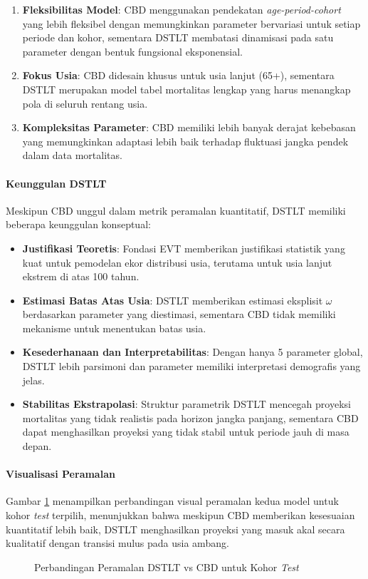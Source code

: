 \begin{enumerate}
    \item \textbf{Fleksibilitas Model}: CBD menggunakan pendekatan \textit{age-period-cohort} yang lebih fleksibel dengan memungkinkan parameter bervariasi untuk setiap periode dan kohor, sementara DSTLT membatasi dinamisasi pada satu parameter dengan bentuk fungsional eksponensial.
    
    \item \textbf{Fokus Usia}: CBD didesain khusus untuk usia lanjut (65+), sementara DSTLT merupakan model tabel mortalitas lengkap yang harus menangkap pola di seluruh rentang usia.
    
    \item \textbf{Kompleksitas Parameter}: CBD memiliki lebih banyak derajat kebebasan yang memungkinkan adaptasi lebih baik terhadap fluktuasi jangka pendek dalam data mortalitas.
\end{enumerate}

\paragraph{Keunggulan DSTLT}
Meskipun CBD unggul dalam metrik peramalan kuantitatif, DSTLT memiliki beberapa keunggulan konseptual:

\begin{itemize}
    \item \textbf{Justifikasi Teoretis}: Fondasi EVT memberikan justifikasi statistik yang kuat untuk pemodelan ekor distribusi usia, terutama untuk usia lanjut ekstrem di atas 100 tahun.
    
    \item \textbf{Estimasi Batas Atas Usia}: DSTLT memberikan estimasi eksplisit $\omega$ berdasarkan parameter yang diestimasi, sementara CBD tidak memiliki mekanisme untuk menentukan batas usia.
    
    \item \textbf{Kesederhanaan dan Interpretabilitas}: Dengan hanya 5 parameter global, DSTLT lebih parsimoni dan parameter memiliki interpretasi demografis yang jelas.
    
    \item \textbf{Stabilitas Ekstrapolasi}: Struktur parametrik DSTLT mencegah proyeksi mortalitas yang tidak realistis pada horizon jangka panjang, sementara CBD dapat menghasilkan proyeksi yang tidak stabil untuk periode jauh di masa depan.
\end{itemize}

\paragraph{Visualisasi Peramalan}
Gambar \ref{fig:forecasting_comparison} menampilkan perbandingan visual peramalan kedua model untuk kohor \textit{test} terpilih, menunjukkan bahwa meskipun CBD memberikan kesesuaian kuantitatif lebih baik, DSTLT menghasilkan proyeksi yang masuk akal secara kualitatif dengan transisi mulus pada usia ambang.

\begin{figure}[htbp]
\centering
{}
\caption{Perbandingan Peramalan DSTLT vs CBD untuk Kohor \textit{Test}}
\label{fig:forecasting_comparison}
\end{figure}

